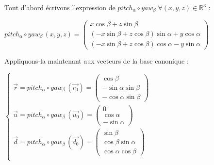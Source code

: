 Tout d'abord écrivons l'expression de $pitch_{\alpha} \circ yaw_{\beta} \; \forall (x, y, z) \in \mathbb{R}^3$ :

$pitch_{\alpha} \circ yaw_{\beta} \, (x, y, z) = \begin{pmatrix} x\cos\beta + z\sin\beta \\ (-x\sin\beta + z\cos\beta)\sin\alpha + y\cos\alpha \\ (-x\sin\beta + z\cos\beta)\cos\alpha - y\sin\alpha \end{pmatrix}$

Appliquons-la maintenant aux vecteurs de la base canonique : 

$\begin{cases}
\vec{r} = pitch_{\alpha} \circ yaw_{\beta} \, (\vec{r_0}) = \begin{pmatrix} \cos\beta \\ -\sin\alpha\sin\beta \\ -\cos\alpha\sin\beta \end{pmatrix}\\
\vec{u} = pitch_{\alpha} \circ yaw_{\beta} \, (\vec{u_0}) = \begin{pmatrix} 0 \\ \cos\alpha \\ -\sin\alpha \end{pmatrix} \\
\vec{d} = pitch_{\alpha} \circ yaw_{\beta} \, (\vec{d_0}) = \begin{pmatrix} \sin\beta \\ \cos\beta\sin\alpha \\ \cos\alpha\cos\beta \end{pmatrix} \\
\end{cases}$

